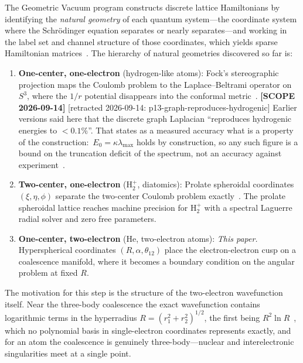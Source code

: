 \documentclass[aps,pra,twocolumn,superscriptaddress,longbibliography]{revtex4-2}
\begin{document}
The Geometric Vacuum program constructs discrete lattice
Hamiltonians by identifying the \emph{natural geometry} of each
quantum system---the coordinate system where the Schr\"odinger
equation separates or nearly separates---and working in the label set
and channel structure of those coordinates, which yields sparse
Hamiltonian matrices~\cite{loutey_paper0, loutey_paper1, loutey_paper7}.
The hierarchy of natural geometries discovered so far is:
\begin{enumerate}
  \item \textbf{One-center, one-electron} (hydrogen-like atoms):
    Fock's stereographic projection maps the Coulomb problem to the
    Laplace--Beltrami operator on $S^3$, where the $1/r$ potential
    disappears into the conformal metric~\cite{Fock1935,
    loutey_paper7}.  \textbf{[SCOPE 2026-09-14]}
    [retracted 2026-09-14: p13-graph-reproduces-hydrogenic]  Earlier versions
    said here that the discrete graph Laplacian ``reproduces hydrogenic
    energies to $<0.1\%$''.  That states as a measured accuracy what is
    a property of the construction:\ $E_0 = \kappa \lambda_{\max}$
    holds by construction, so any such figure is a bound on the
    truncation deficit of the spectrum, not an accuracy against
    experiment~\cite{loutey_paper0, loutey_paper1}.

  \item \textbf{Two-center, one-electron} (H$_2^+$, diatomics):
    Prolate spheroidal coordinates $(\xi, \eta, \phi)$ separate the
    two-center Coulomb problem exactly~\cite{loutey_paper11}.  The
    prolate spheroidal lattice reaches machine precision for H$_2^+$
    with a spectral Laguerre radial solver and zero free parameters.

  \item \textbf{One-center, two-electron} (He, two-electron atoms):
    \emph{This paper.}  Hyperspherical coordinates $(R, \alpha,
    \theta_{12})$ place the electron-electron cusp on a coalescence
    manifold, where it becomes a boundary condition on the angular
    problem at fixed $R$.
\end{enumerate}

The motivation for this step is the structure of the two-electron
wavefunction itself.  Near the three-body coalescence the exact
wavefunction contains logarithmic terms in the hyperradius
$R = (r_1^2 + r_2^2)^{1/2}$, the first being $R^2\ln R$~\cite{Fock1954}, which no polynomial basis in
single-electron coordinates represents exactly, and for an atom the
coalescence is genuinely three-body---nuclear and interelectronic
singularities meet at a single point.
\end{document}
